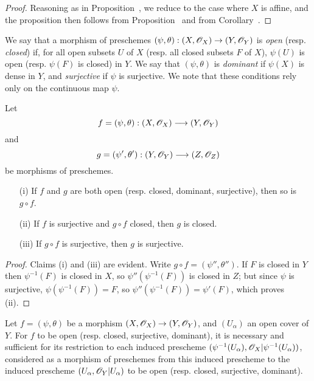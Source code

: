 \begin{proof}
Reasoning as in Proposition~, we reduce to the case where $X$ is affine, and the proposition then follows from Proposition~ and from Corollary~.
\end{proof}

\begin{env}[2.2.6]
\label{I.2.2.6}
We say that a morphism of preschemes $(\psi,\theta):(X,\sh{O}_X)\to(Y,\sh{O}_Y)$ is \emph{open} (resp. \emph{closed}) if, for all open subsets $U$ of $X$ (resp. all closed subsets $F$ of $X$), $\psi(U)$ is open (resp. $\psi(F)$ is closed) in $Y$.
We say that $(\psi,\theta)$ is \emph{dominant} if $\psi(X)$ is dense in $Y$, and \emph{surjective} if $\psi$ is surjective.
We note that these conditions rely only on the continuous map $\psi$.
\end{env}

\begin{proposition}[2.2.7]
\label{I.2.2.7}
Let
\[
  f=(\psi,\theta):(X,\sh{O}_X)\to(Y,\sh{O}_Y)
\]
and
\[
  g=(\psi',\theta'):(Y,\sh{O}_Y)\to(Z,\sh{O}_Z)
\]
be morphisms of preschemes.
\begin{enumerate}
  \item[{\rm(i)}] If $f$ and $g$ are both open (resp. closed, dominant, surjective),
    then so is $g\circ f$.
  \item[{\rm(ii)}] If $f$ is surjective and $g\circ f$ closed, then $g$ is closed.
  \item[{\rm(iii)}] If $g\circ f$ is surjective, then $g$ is surjective.
\end{enumerate}
\end{proposition}

\begin{proof}
Claims (i) and (iii) are evident.
Write $g\circ f=(\psi'',\theta'')$.
If $F$ is closed in $Y$ then $\psi^{-1}(F)$ is closed in $X$, so $\psi''(\psi^{-1}(F))$ is closed in $Z$;
but since $\psi$ is surjective, $\psi(\psi^{-1}(F))=F$, so $\psi''(\psi^{-1}(F))=\psi'(F)$, which proves (ii).
\end{proof}

\begin{proposition}[2.2.8]
\label{I.2.2.8}
Let $f=(\psi,\theta)$ be a morphism $(X,\sh{O}_X)\to(Y,\sh{O}_Y)$, and $(U_\alpha)$ an open cover of $Y$.
For $f$ to be open (resp. closed, surjective, dominant), it is necessary and sufficient for its restriction to each induced prescheme $(\psi^{-1}(U_\alpha),\mathscr{O}_X|\psi^{-1}(U_\alpha))$, considered as a morphism of preschemes from this induced prescheme to the induced prescheme $(U_\alpha,\mathscr{O}_Y|U_\alpha)$ to be open (resp. closed, surjective, dominant).
\end{proposition}

